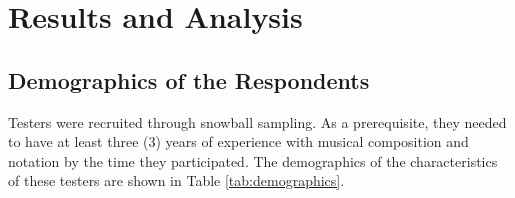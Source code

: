 
\chapter{Results and Analysis}	

	\section{Demographics of the Respondents}
	\label{sec:demographics}
		
		Testers were recruited through snowball sampling. As a prerequisite, they needed to have at least three (3) years of experience with musical composition and notation by the time they participated. The demographics of the characteristics of these testers are shown in Table \ref{tab:demographics}.


